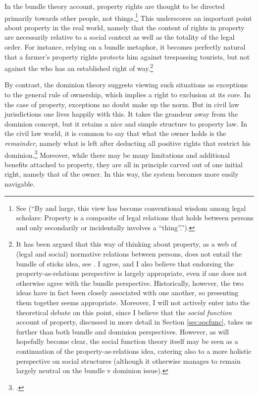 In the bundle theory account, property rights are thought to be directed primarily towards other people, not things.\footnote{See \cite[357-358]{merrill01} (``By and large, this view has become conventional wisdom among legal scholars: Property is a composite of legal relations that holds between persons and only secondarily or incidentally involves a ``thing''.'').} This underscores an important point about property in the real world, namely that the content of rights in property are necessarily relative to a social context as well as the totality of the legal order. For instance, relying on a bundle metaphor, it becomes perfectly natural that a farmer's property rights protects him against trespassing tourists, but not against the  who has an established right of way.\footnote{It has been argued that this way of thinking about property, as a web of (legal and social) normative relations between persons, does not entail the bundle of sticks idea, see \cite[23-25]{dorfman10}. I agree, and I also believe that endorsing the property-as-relations perspective is largely appropriate, even if one does not otherwise agree with the bundle perspective. Historically, however, the two ideas have in fact been closely associated with one another, so presenting them together seems appropriate. Moreover, I will not actively enter into the theoretical debate on this point, since I believe that the {\it social function} account of property, discussed in more detail in Section \ref{sec:socfunc}, takes us further than both bundle and dominion perspectives. However, as will hopefully become clear, the social function theory itself may be seen as a continuation of the property-as-relations idea, catering also to a more holistic perspective on social structures (although it otherwise manages to remain largely neutral on the bundle v dominion issue).}

By contrast, the dominion theory suggests viewing such situations as exceptions to the general rule of ownership, which implies a right to exclusion at its core. In the case of property, exceptions no doubt make up the norm. But in civil law jurisdictions one lives happily with this. It takes the grandeur away from the dominion concept, but it retains a nice and simple structure to property law. In the civil law world, it is common to say that what the owner holds is the {\it remainder}, namely what is left after deducting all positive rights that restrict his dominion.\footcite[25]{chang12} Moreover, while there may be many limitations and additional benefits attached to property, they are all in principle carved out of one initial right, namely that of the owner. In this way, the system becomes more easily navigable.


